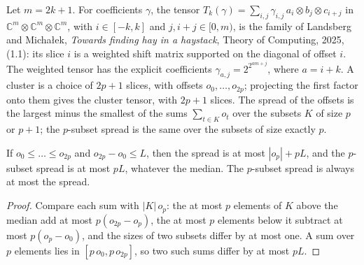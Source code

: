 \begin{definition}
  \label{def:frontiers-lm-tensor}
  \leanok
  Let $m = 2k + 1$. For coefficients $\gamma$, the tensor
  $T_k(\gamma) = \sum_{i, j} \gamma_{i, j}\, a_i \otimes b_j \otimes c_{i + j}$ in
  $\mathbb{C}^m \otimes \mathbb{C}^m \otimes \mathbb{C}^m$, with $i \in [-k, k]$ and
  $j, i + j \in [0, m)$, is the family of Landsberg and Micha{\l}ek, \emph{Towards finding
  hay in a haystack}, Theory of Computing, 2025, (1.1): its slice $i$ is a weighted shift
  matrix supported on the diagonal of offset $i$. The weighted tensor has the explicit
  coefficients $\gamma_{a, j} = 2^{2^{a m + j}}$, where $a = i + k$. A cluster is a choice
  of $2p + 1$ slices, with offsets $o_0, \dots, o_{2p}$; projecting the first factor onto
  them gives the cluster tensor, with $2p + 1$ slices. The spread of the offsets is the
  largest minus the smallest of the sums $\sum_{t \in K} o_t$ over the subsets $K$ of size
  $p$ or $p + 1$; the $p$-subset spread is the same over the subsets of size exactly $p$.
\end{definition}

\begin{lemma}
  \label{lem:frontiers-cluster-spread}
  \leanok
  If $o_0 \le \dots \le o_{2p}$ and $o_{2p} - o_0 \le L$, then the spread is at most
  $|o_p| + pL$, and the $p$-subset spread is at most $pL$, whatever the median. The
  $p$-subset spread is always at most the spread.
\end{lemma}
\begin{proof}
  \leanok
  Compare each sum with $|K|\, o_p$: the at most $p$ elements of $K$ above the median add
  at most $p (o_{2p} - o_p)$, the at most $p$ elements below it subtract at most
  $p (o_p - o_0)$, and the sizes of two subsets differ by at most one. A sum over $p$
  elements lies in $[p\, o_0, p\, o_{2p}]$, so two such sums differ by at most $pL$.
\end{proof}

